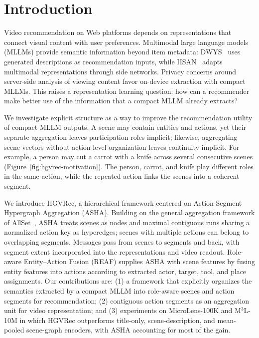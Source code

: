 \section{Introduction}
\label{sec:introduction}
Video recommendation on Web platforms depends on representations that connect visual content with user preferences.
Multimodal large language models (MLLMs) provide semantic information beyond item metadata: DWYS~\cite{denadai2025dwys} uses generated descriptions as recommendation inputs, while IISAN~\cite{fu2024iisan} adapts multimodal representations through side networks.
Privacy concerns around server-side analysis of viewing content favor on-device extraction with compact MLLMs.
This raises a representation learning question: how can a recommender make better use of the information that a compact MLLM already extracts?

We investigate explicit structure as a way to improve the recommendation utility of compact MLLM outputs.
A scene may contain entities and actions, yet their separate aggregation leaves participation roles implicit; likewise, aggregating scene vectors without action-level organization leaves continuity implicit.
For example, a person may cut a carrot with a knife across several consecutive scenes (Figure~\ref{fig:hgvrec-motivation}).
The person, carrot, and knife play different roles in the same action, while the repeated action links the scenes into a coherent segment.

We introduce HGVRec, a hierarchical framework centered on Action-Segment Hypergraph Aggregation (ASHA).
Building on the general aggregation framework of AllSet~\cite{chien2022allset}, ASHA treats scenes as nodes and maximal contiguous runs sharing a normalized action key as hyperedges; scenes with multiple actions can belong to overlapping segments.
Messages pass from scenes to segments and back, with segment extent incorporated into the representations and video readout.
Role-aware Entity--Action Fusion (REAF) supplies ASHA with scene features by fusing entity features into actions according to extracted actor, target, tool, and place assignments.
Our contributions are:
(1) a framework that explicitly organizes the semantics extracted by a compact MLLM into role-aware scenes and action segments for recommendation;
(2) contiguous action segments as an aggregation unit for video representation; and
(3) experiments on MicroLens-100K and M$^3$L-10M in which HGVRec outperforms title-only, scene-description, and mean-pooled scene-graph encoders, with ASHA accounting for most of the gain.

